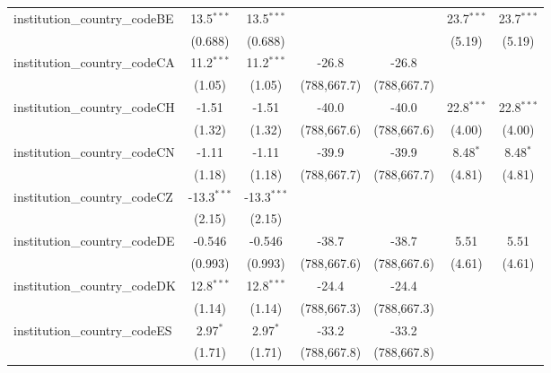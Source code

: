 \begin{tabular}{lcccccc}
   institution\_country\_codeBE          & 13.5$^{***}$  & 13.5$^{***}$  &             &             & 23.7$^{***}$  & 23.7$^{***}$\\   
                                         & (0.688)       & (0.688)       &             &             & (5.19)        & (5.19)\\   
   institution\_country\_codeCA          & 11.2$^{***}$  & 11.2$^{***}$  & -26.8       & -26.8       &               &   \\   
                                         & (1.05)        & (1.05)        & (788,667.7) & (788,667.7) &               &   \\   
   institution\_country\_codeCH          & -1.51         & -1.51         & -40.0       & -40.0       & 22.8$^{***}$  & 22.8$^{***}$\\   
                                         & (1.32)        & (1.32)        & (788,667.6) & (788,667.6) & (4.00)        & (4.00)\\   
   institution\_country\_codeCN          & -1.11         & -1.11         & -39.9       & -39.9       & 8.48$^{*}$    & 8.48$^{*}$\\   
                                         & (1.18)        & (1.18)        & (788,667.7) & (788,667.7) & (4.81)        & (4.81)\\   
   institution\_country\_codeCZ          & -13.3$^{***}$ & -13.3$^{***}$ &             &             &               &   \\   
                                         & (2.15)        & (2.15)        &             &             &               &   \\   
   institution\_country\_codeDE          & -0.546        & -0.546        & -38.7       & -38.7       & 5.51          & 5.51\\   
                                         & (0.993)       & (0.993)       & (788,667.6) & (788,667.6) & (4.61)        & (4.61)\\   
   institution\_country\_codeDK          & 12.8$^{***}$  & 12.8$^{***}$  & -24.4       & -24.4       &               &   \\   
                                         & (1.14)        & (1.14)        & (788,667.3) & (788,667.3) &               &   \\   
   institution\_country\_codeES          & 2.97$^{*}$    & 2.97$^{*}$    & -33.2       & -33.2       &               &   \\   
                                         & (1.71)        & (1.71)        & (788,667.8) & (788,667.8) &               &   \\   

\end{tabular}
